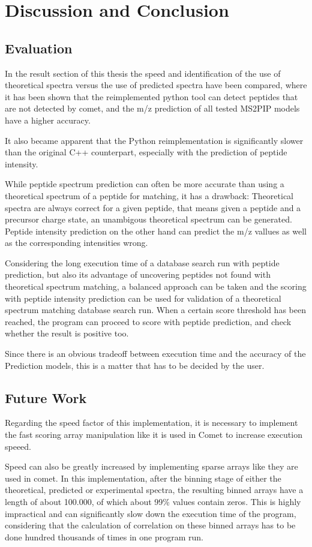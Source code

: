 \documentclass[11pt]{article}
\begin{document}
\section{Discussion and Conclusion}
\subsection{Evaluation}
In the result section of this thesis the speed and identification of the use of theoretical spectra versus the use of predicted spectra have been compared, where it has been shown that the reimplemented python tool can detect peptides that are not detected by comet, and the m/z prediction of all tested MS2PIP models have a higher accuracy.

It also became apparent that the Python reimplementation is significantly slower than the original C++ counterpart, especially with the prediction of peptide intensity.

While peptide spectrum prediction can often be more accurate than using a theoretical spectrum of a peptide for matching,
it has a drawback: Theoretical spectra are always correct for a given peptide, that means given a peptide and a precursor charge state, an unambigous theoretical spectrum can be generated. Peptide intensity prediction on the other hand can predict the m/z vallues as well as the corresponding intensities wrong.

Considering the long execution time of a database search run with peptide prediction, but also its advantage of uncovering peptides not found with theoretical spectrum matching, a balanced approach can be taken and the scoring with peptide intensity prediction can be used for validation of a theoretical spectrum matching database search run. When a certain score threshold has been reached, the program can proceed to score with peptide prediction, and check whether the result is positive too.

Since there is an obvious tradeoff between execution time and the accuracy of the Prediction models, this is a matter that has to be decided by the user.

\subsection{Future Work}
Regarding the speed factor of this implementation, it is necessary to implement the fast scoring array manipulation like it is used in Comet to increase execution speeed. 

Speed can also be greatly increased by implementing sparse arrays like they are used in comet. In this implementation, after the binning stage of either the theoretical, predicted or experimental spectra, the resulting binned arrays have a length of about 100.000, of which about 99\% values contain zeros. This is highly impractical and can significantly slow down the execution time of the program, considering that the calculation of correlation on these binned arrays has to be done hundred thousands of times in one program run.
\end{document}
